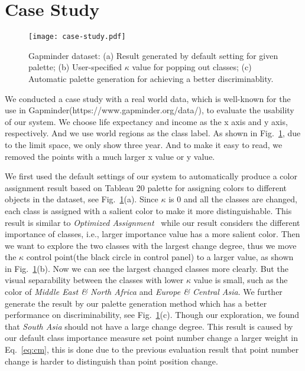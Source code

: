 \section{Case Study}
\label{sec:caseStudy}

\begin{figure}[h]
\centering
\texttt{[image: case-study.pdf]}
\caption{Gapminder dataset: (a) Result generated by default setting for given palette; (b) User-specified $\kappa$ value for popping out classes; (c) Automatic palette generation for achieving a better discriminablity.}
\label{fig:casestudy}
\vspace{-4mm}
\end{figure}


We conducted a case study with a real world data, which is well-known for the use in Gapminder(https://www.gapminder.org/data/), to evaluate the usability of our system. 
We choose life expectancy and income as the x axis and y axis, respectively. And we use world regions as the class label. As shown in Fig.~\ref{fig:casestudy}, due to the limit space, we only show three year. And to make it easy to read, we removed the points with a much larger x value or y value.

We first used the default settings of our system to automatically produce a color assignment result based on Tableau 20 palette for assigning colors to different objects in the dataset, see Fig.~\ref{fig:casestudy}(a). Since $\kappa$ is $0$ and all the classes are changed, each class is assigned with a salient color to make it more distinguishable. This result is similar to \emph{Optimized Assignment}~\cite{Wang2018} while our result considers the different importance of classes, i.e., larger importance value has a more salient color.
Then we want to explore the two classes with the largest change degree, thus we move the $\kappa$ control point(the black circle in control panel) to a larger value, as shown in Fig.~\ref{fig:casestudy}(b). Now we can see the largest changed classes more clearly. But the visual separability between the classes with lower $\kappa$ value is small, such as the color of \emph{Middle East \& North Africa} and \emph{Europe \& Central Asia}. We further generate the result by our palette generation method which has a better performance on discriminability, see Fig.~\ref{fig:casestudy}(c).
Though our exploration, we found that \emph{South Asia} should not have a large change degree. This result is caused by our default class importance measure set point number change a larger weight in Eq.~\ref{eq:cm}, this is done due to the previous evaluation result that point number change is harder to distinguish than point position change.

